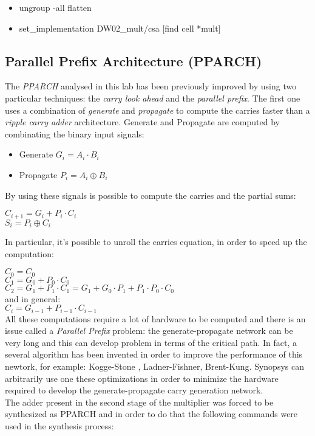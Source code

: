 \begin{itemize}
\item ungroup -all flatten
\item set\_implementation DW02\_mult/csa [find cell *mult]
\end{itemize}

\subsection{Parallel Prefix Architecture (PPARCH)}

The \textit{PPARCH} analysed in this lab has been previously improved by using two particular techniques: the \textit{carry look ahead} and the \textit{parallel prefix}. The first one uses a combination of \textit{generate} and \textit{propagate} to compute the carries faster than a \textit{ripple carry adder} architecture. Generate and Propagate are computed by combinating the binary input signals:
\begin{itemize}
\item Generate $G_i = A_i \cdot B_i$
\item Propagate $P_i = A_i \oplus B_i$
\end{itemize}
By using these signals is possible to compute the carries and the partial sums:
\begin{center}
$C_{i+1} = G_i + P_i \cdot C_i$ \\
$S_i = P_i \oplus C_i $
\end{center}
In particular, it's possible to unroll the carries equation, in order to speed up the computation:

\noindent
$C_0 = C_0$ \\
$C_1 = G_0 + P_0 \cdot C_0$\\
$C_2 = G_1 + P_1 \cdot C_1 = G_1 + G_0 \cdot P_1  + P_1 \cdot P_0 \cdot C_0$\\
and in general: \\
$C_i = G_{i-1} + P_{i-1} \cdot C_{i-1}$\\
\noindent
All these computations require a lot of hardware to be computed and there is an issue called a \textit{Parallel Prefix} problem: the generate-propagate network can be very long and this can develop problem in terms of the critical path. In fact, a several algorithm has been invented in order to improve the performance of this newtork, for example: Kogge-Stone , Ladner-Fishner, Brent-Kung. Synopsys can arbitrarily use one these optimizations in order to minimize the hardware required to develop the generate-propagate carry generation network.
\\
The adder present in the second stage of the multiplier was forced to be synthesized as PPARCH and in order to do that the following commands were used in the synthesis process:

